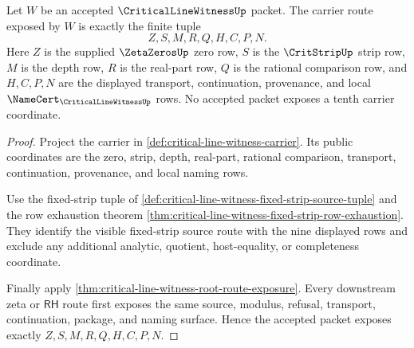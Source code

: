 \begin{theorem}
\label{thm:critical-line-witness-carrier-route-exactness}
Let $W$ be an accepted $\CriticalLineWitnessUp$ packet. The carrier route exposed by $W$ is exactly the finite tuple
$$
Z,S,M,R,Q,H,C,P,N.
$$
Here $Z$ is the supplied $\ZetaZerosUp$ zero row, $S$ is the $\CritStripUp$ strip row, $M$ is the depth row, $R$ is the real-part row, $Q$ is the rational comparison row, and $H,C,P,N$ are the displayed transport, continuation, provenance, and local $\NameCert_{\CriticalLineWitnessUp}$ rows. No accepted packet exposes a tenth carrier coordinate.
\end{theorem}
\begin{proof}
Project the carrier in \autoref{def:critical-line-witness-carrier}. Its public coordinates are the zero, strip, depth, real-part, rational comparison, transport, continuation, provenance, and local naming rows.

Use the fixed-strip tuple of \autoref{def:critical-line-witness-fixed-strip-source-tuple} and the row exhaustion theorem \autoref{thm:critical-line-witness-fixed-strip-row-exhaustion}. They identify the visible fixed-strip source route with the nine displayed rows and exclude any additional analytic, quotient, host-equality, or completeness coordinate.

Finally apply \autoref{thm:critical-line-witness-root-route-exposure}. Every downstream zeta or $\mathsf{RH}$ route first exposes the same source, modulus, refusal, transport, continuation, package, and naming surface. Hence the accepted packet exposes exactly $Z,S,M,R,Q,H,C,P,N$.
\end{proof}


